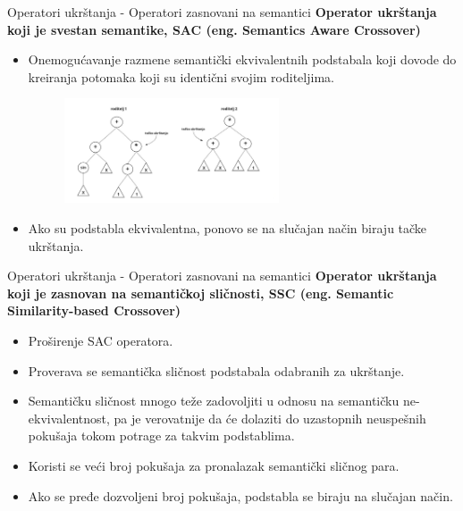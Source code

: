 \documentclass{beamer}
\begin{document}
\begin{frame}{Operatori ukrštanja - Operatori zasnovani na semantici}
\small
\textbf{Operator ukrštanja koji je svestan semantike, SAC (eng. Semantics Aware Crossover)}
\begin{itemize}
    \item Onemogućavanje razmene semantički ekvivalentnih podstabala koji dovode do kreiranja potomaka koji su identični svojim roditeljima.
    
    \begin{figure}[!ht]
    \begin{center}
    \includegraphics[width=0.6\textwidth]{images/SAC1.jpg}
    \end{center}
    \label{fig:sac1}
    \end{figure} 
    
    \item Ako su podstabla ekvivalentna, ponovo se na slučajan način biraju tačke ukrštanja.
\end{itemize}
\end{frame}


\begin{frame}{Operatori ukrštanja - Operatori zasnovani na semantici}
\small
\textbf{Operator ukrštanja koji je zasnovan na semantičkoj sličnosti, SSC (eng. Semantic Similarity-based Crossover)}
\begin{itemize}
    \item Proširenje SAC operatora.
    \item Proverava se semantička sličnost podstabala odabranih za ukrštanje.
    \item Semantičku sličnost mnogo teže zadovoljiti u odnosu na semantičku ne-ekvivalentnost, pa je verovatnije da će dolaziti do uzastopnih neuspešnih pokušaja tokom potrage za takvim podstablima.
    \item Koristi se veći broj pokušaja za pronalazak semantički sličnog para.
    \item Ako se pređe dozvoljeni broj pokušaja, podstabla se biraju na slučajan način.
\end{itemize}
\end{frame}
\end{document}
